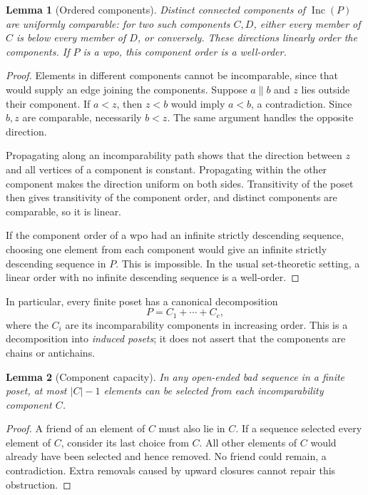 \documentclass[11pt,letterpaper]{article}
\newtheorem{lemma}[lemma]{Lemma}
\theoremstyle{definition}
\theoremstyle{remark}
\newcommand{\Inc}{\operatorname{Inc}}
\begin{document}
\begin{lemma}[Ordered components]\label{lem:ordered-components}
Distinct connected components of $\Inc(P)$ are uniformly comparable:
for two such components $C,D$, either every member of $C$ is below every
member of $D$, or conversely. These directions linearly order the components.
If $P$ is a wpo, this component order is a well-order.
\end{lemma}
\begin{proof}
Elements in different components cannot be incomparable, since that would
supply an edge joining the components. Suppose $a\parallel b$ and $z$ lies
outside their component. If $a<z$, then $z<b$ would imply $a<b$, a
contradiction. Since $b,z$ are comparable, necessarily $b<z$. The same
argument handles the opposite direction.

Propagating along an incomparability path shows that the direction between
$z$ and all vertices of a component is constant. Propagating within the
other component makes the direction uniform on both sides. Transitivity of
the poset then gives transitivity of the component order, and distinct
components are comparable, so it is linear.

If the component order of a wpo had an infinite strictly descending sequence,
choosing one element from each component would give an infinite strictly
descending sequence in $P$. This is impossible. In the usual set-theoretic
setting, a linear order with no infinite descending sequence is a well-order.
\end{proof}

In particular, every finite poset has a canonical decomposition
\begin{equation}\label{eq:component-sum}
 P=C_1+\cdots+C_c,
\end{equation}
where the $C_i$ are its incomparability components in increasing order.
This is a decomposition into \emph{induced posets}; it does not assert that
the components are chains or antichains.

\begin{lemma}[Component capacity]\label{lem:capacity}
In any open-ended bad sequence in a finite poset, at most $|C|-1$ elements
can be selected from each incomparability component $C$.
\end{lemma}
\begin{proof}
A friend of an element of $C$ must also lie in $C$. If a sequence selected
every element of $C$, consider its last choice from $C$. All other elements
of $C$ would already have been selected and hence removed. No friend could
remain, a contradiction. Extra removals caused by upward closures cannot
repair this obstruction.
\end{proof}
\end{document}
